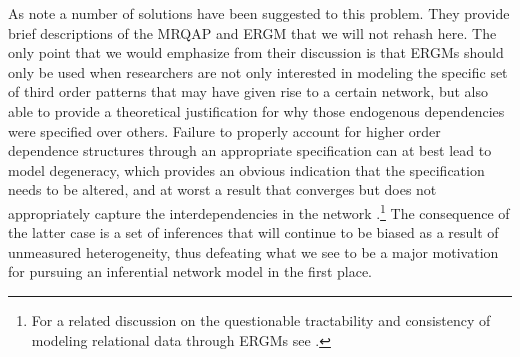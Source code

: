 As \citet{cranmer:etal:2016} note a number of solutions have been suggested to this problem. They provide brief descriptions of the MRQAP and ERGM that we will not rehash here. The only point that we would emphasize from their discussion is that ERGMs should only be used when researchers are not only interested in modeling the specific set of third order patterns that may have given rise to a certain network, but also able to provide a theoretical justification for why those endogenous dependencies were specified over others. Failure to properly account for higher order dependence structures through an appropriate specification can at best lead to model degeneracy, which provides an obvious indication that the specification needs to be altered, and at worst a result that converges but does not appropriately capture the interdependencies in the network \citep{handcock:2003b,hunter:etal:2012}.\footnote{For a related discussion on the questionable tractability and consistency of modeling relational data through ERGMs see \citet{bhamidi:etal:2008,chatterjee:diaconis:2013,chandrasekhar:jackson:2014}.} The consequence of the latter case is a set of inferences that will continue to be biased as a result of unmeasured heterogeneity, thus defeating what we see to be a major motivation for pursuing an inferential network model in the first place. 



